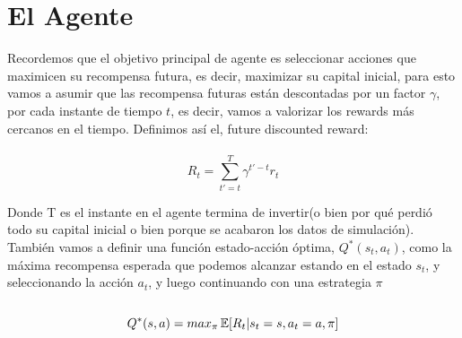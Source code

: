 \section{El Agente}

Recordemos que el objetivo principal de agente es seleccionar acciones que maximicen su recompensa futura, es decir, maximizar su capital inicial, para esto vamos a asumir que las recompensa futuras están descontadas por un factor $\gamma$, por cada instante de tiempo $t$, es decir, vamos a valorizar los rewards más cercanos en el tiempo. Definimos así el, future discounted reward:
\\\\
\begin{equation}
	 R_t = \sum\limits_{t'= t}^T  \gamma^{t'-t} r_t
\end{equation}

Donde T es el instante en el agente termina de invertir(o bien por qué perdió todo su capital inicial o bien porque se acabaron los datos de simulación).\\
También vamos a definir una función estado-acción óptima, $Q^*(s_t, a_t)$, como la máxima recompensa esperada que podemos alcanzar estando en el estado $s_t$, y seleccionando la acción $a_t$, y luego continuando con una estrategia $\pi$
\\\\
\begin{equation}
Q^*(s, a) = max_{\pi} \operatorname{\mathbb{E}} [R_t  |  s_t = s, a_t = a, \pi]
\end{equation}
\\

